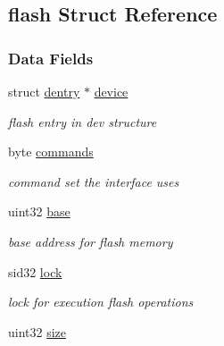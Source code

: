 \hypertarget{structflash}{}\subsection{flash Struct Reference}
\label{structflash}
\subsubsection*{Data Fields}
\begin{DoxyCompactItemize}
\item 
\mbox{\label{structflash_ac7d8e60183550c0b4adabb41e400bee8}} 
struct \hyperlink{structdentry}{dentry} $\ast$ \hyperlink{structflash_ac7d8e60183550c0b4adabb41e400bee8}{device}
\begin{DoxyCompactList}\small\item\em flash entry in dev structure \end{DoxyCompactList}\item 
\mbox{\label{structflash_a142e6197e8137ac008033ad467e9bf40}} 
byte \hyperlink{structflash_a142e6197e8137ac008033ad467e9bf40}{commands}
\begin{DoxyCompactList}\small\item\em command set the interface uses \end{DoxyCompactList}\item 
\mbox{\label{structflash_a6310de3fdc10193bcaf31cd79e040265}} 
uint32 \hyperlink{structflash_a6310de3fdc10193bcaf31cd79e040265}{base}
\begin{DoxyCompactList}\small\item\em base address for flash memory \end{DoxyCompactList}\item 
\mbox{\label{structflash_a229310e5bcb3bb8dbed640c3a136653c}} 
sid32 \hyperlink{structflash_a229310e5bcb3bb8dbed640c3a136653c}{lock}
\begin{DoxyCompactList}\small\item\em lock for execution flash operations \end{DoxyCompactList}\item 
\mbox{\label{structflash_a92d2ba0bad7428d3f82bba6d4e36c87a}} 
uint32 \hyperlink{structflash_a92d2ba0bad7428d3f82bba6d4e36c87a}{size}

\end{DoxyCompactItemize}
